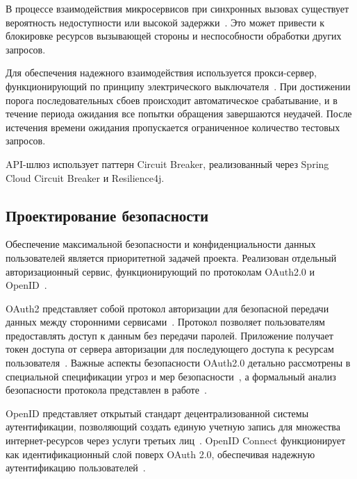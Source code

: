В процессе взаимодействия микросервисов при синхронных вызовах существует вероятность недоступности или высокой задержки~\cite{richardson_circuit_breaker}. Это может привести к блокировке ресурсов вызывающей стороны и неспособности обработки других запросов.

Для обеспечения надежного взаимодействия используется прокси-сервер, функционирующий по принципу электрического выключателя~\cite{richardson2018microservices}. При достижении порога последовательных сбоев происходит автоматическое срабатывание, и в течение периода ожидания все попытки обращения завершаются неудачей.
После истечения времени ожидания пропускается ограниченное количество тестовых запросов.

API-шлюз использует паттерн Circuit Breaker, реализованный через Spring Cloud Circuit Breaker и Resilience4j.

\subsection{Проектирование безопасности}

Обеспечение максимальной безопасности и конфиденциальности данных пользователей является приоритетной задачей проекта.
Реализован отдельный авторизационный сервис, функционирующий по протоколам OAuth2.0 и OpenID~\cite{18_hardt2012,openid_foundation2014}.

OAuth2 представляет собой протокол авторизации для безопасной передачи данных между сторонними сервисами~\cite{richer2017}.
Протокол позволяет пользователям предоставлять доступ к данным без передачи паролей. Приложение получает токен доступа от сервера авторизации для последующего доступа к ресурсам пользователя~\cite{18_hardt2012}.
Важные аспекты безопасности OAuth2.0 детально рассмотрены в специальной спецификации угроз и мер безопасности~\cite{lodderstedt2013}, а формальный анализ безопасности протокола представлен в работе~\cite{fett2016}.

OpenID представляет открытый стандарт децентрализованной системы аутентификации, позволяющий создать единую учетную запись для множества интернет-ресурсов через услуги третьих лиц~\cite{19_weingartner2017,sakimura2015}.
OpenID Connect функционирует как идентификационный слой поверх OAuth 2.0, обеспечивая надежную аутентификацию пользователей~\cite{openid_foundation2014}.

